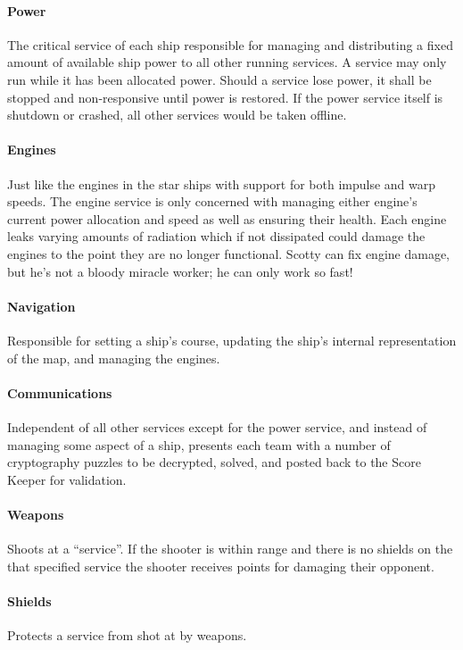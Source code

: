 \documentclass[10pt]{article}
\begin{document}
\paragraph*{Power} The critical service of each ship responsible for managing
and distributing a fixed amount of available ship power to all other running
services. A service may only run while it has been allocated power. Should a
service lose power, it shall be stopped and non-responsive until power is
restored. If the power service itself is shutdown or crashed, all other
services would be taken offline.

\paragraph*{Engines} Just like the engines in the star ships with support for
both impulse and warp speeds. The engine service is only concerned with
managing either engine's current power allocation and speed as well as ensuring
their health. Each engine leaks varying amounts of radiation which if not
dissipated could damage the engines to the point they are no longer functional.
Scotty can fix engine damage, but he's not a bloody miracle worker; he can only
work so fast!

\paragraph*{Navigation} Responsible for setting a ship's course, updating the
ship's internal representation of the map, and managing the engines.

\paragraph*{Communications} Independent of all other services except for the
power service, and instead of managing some aspect of a ship, presents each team
with a number of cryptography puzzles to be decrypted, solved, and posted back
to the Score Keeper for validation.

\paragraph*{Weapons} Shoots at a ``service''.  If the shooter is within
range and there is no shields on the that specified service the shooter receives
points for damaging their opponent.

\paragraph*{Shields} Protects a service from shot at by weapons.
\end{document}
